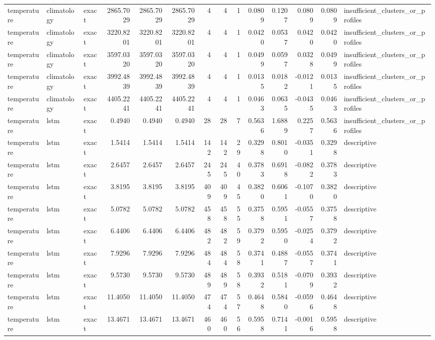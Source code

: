 \begin{tabular}{lllrrrrrrrrrrl}
temperature & climatology & exact & 2865.7029 & 2865.7029 & 2865.7029 & 4 & 4 & 1 & 0.0809 & 0.1207 & 0.0809 & 0.0809 & insufficient_clusters_or_profiles \\
temperature & climatology & exact & 3220.8201 & 3220.8201 & 3220.8201 & 4 & 4 & 1 & 0.0420 & 0.0537 & 0.0420 & 0.0420 & insufficient_clusters_or_profiles \\
temperature & climatology & exact & 3597.0320 & 3597.0320 & 3597.0320 & 4 & 4 & 1 & 0.0499 & 0.0597 & 0.0328 & 0.0499 & insufficient_clusters_or_profiles \\
temperature & climatology & exact & 3992.4839 & 3992.4839 & 3992.4839 & 4 & 4 & 1 & 0.0135 & 0.0182 & -0.0121 & 0.0135 & insufficient_clusters_or_profiles \\
temperature & climatology & exact & 4405.2241 & 4405.2241 & 4405.2241 & 4 & 4 & 1 & 0.0463 & 0.0635 & -0.0435 & 0.0463 & insufficient_clusters_or_profiles \\
temperature & lstm & exact & 0.4940 & 0.4940 & 0.4940 & 28 & 28 & 7 & 0.5636 & 1.6889 & 0.2257 & 0.5636 & insufficient_clusters_or_profiles \\
temperature & lstm & exact & 1.5414 & 1.5414 & 1.5414 & 142 & 142 & 29 & 0.3298 & 0.8010 & -0.0351 & 0.3298 & descriptive \\
temperature & lstm & exact & 2.6457 & 2.6457 & 2.6457 & 245 & 245 & 40 & 0.3783 & 0.6918 & -0.0822 & 0.3783 & descriptive \\
temperature & lstm & exact & 3.8195 & 3.8195 & 3.8195 & 409 & 409 & 45 & 0.3820 & 0.6061 & -0.1070 & 0.3820 & descriptive \\
temperature & lstm & exact & 5.0782 & 5.0782 & 5.0782 & 458 & 458 & 55 & 0.3758 & 0.5951 & -0.0557 & 0.3758 & descriptive \\
temperature & lstm & exact & 6.4406 & 6.4406 & 6.4406 & 482 & 482 & 59 & 0.3792 & 0.5950 & -0.0254 & 0.3792 & descriptive \\
temperature & lstm & exact & 7.9296 & 7.9296 & 7.9296 & 484 & 484 & 58 & 0.3741 & 0.4887 & -0.0557 & 0.3741 & descriptive \\
temperature & lstm & exact & 9.5730 & 9.5730 & 9.5730 & 489 & 489 & 58 & 0.3932 & 0.5181 & -0.0709 & 0.3932 & descriptive \\
temperature & lstm & exact & 11.4050 & 11.4050 & 11.4050 & 474 & 474 & 57 & 0.4648 & 0.5840 & -0.0596 & 0.4648 & descriptive \\
temperature & lstm & exact & 13.4671 & 13.4671 & 13.4671 & 460 & 460 & 56 & 0.5958 & 0.7141 & -0.0016 & 0.5958 & descriptive \\

\end{tabular}

